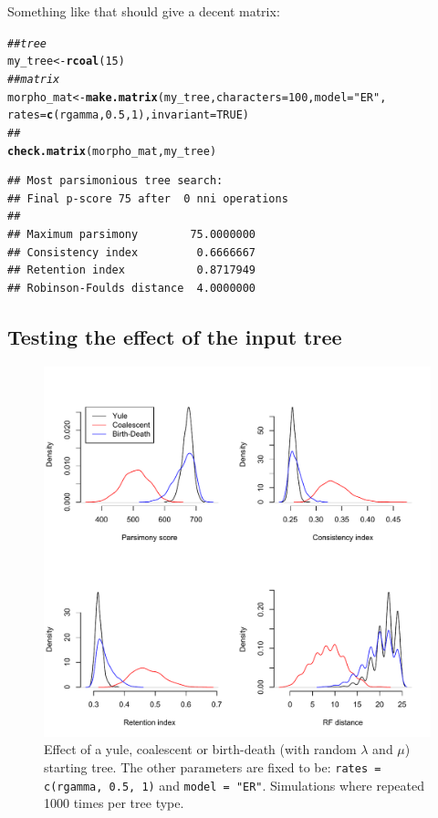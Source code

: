 \documentclass{article}\usepackage[]{graphicx}\usepackage[]{color}
\makeatletter
\newcommand{\hlnum}[1]{\textcolor[rgb]{0.686,0.059,0.569}{#1}}%
\newcommand{\hlstr}[1]{\textcolor[rgb]{0.192,0.494,0.8}{#1}}%
\newcommand{\hlcom}[1]{\textcolor[rgb]{0.678,0.584,0.686}{\textit{#1}}}%
\newcommand{\hlstd}[1]{\textcolor[rgb]{0.345,0.345,0.345}{#1}}%
\newcommand{\hlkwb}[1]{\textcolor[rgb]{0.69,0.353,0.396}{#1}}%
\newcommand{\hlkwc}[1]{\textcolor[rgb]{0.333,0.667,0.333}{#1}}%
\newcommand{\hlkwd}[1]{\textcolor[rgb]{0.737,0.353,0.396}{\textbf{#1}}}%
\newenvironment{kframe}{%
 \def\at@end@of@kframe{}%
 \ifinner\ifhmode%
  \def\at@end@of@kframe{\end{minipage}}%
  \begin{minipage}{\columnwidth}%
 \fi\fi%
 \def\FrameCommand##1{\hskip\@totalleftmargin \hskip-\fboxsep
 \colorbox{shadecolor}{##1}\hskip-\fboxsep
     \hskip-\linewidth \hskip-\@totalleftmargin \hskip\columnwidth}%
 \MakeFramed {\advance\hsize-\width
   \@totalleftmargin\z@ \linewidth\hsize
   \@setminipage}}%
 {\par\unskip\endMakeFramed%
 \at@end@of@kframe}
\newenvironment{knitrout}{}{} %
\makeatother
\begin{document}
Something like that should give a decent matrix:
\begin{knitrout}
\color{fgcolor}\begin{kframe}
\begin{alltt}
\hlcom{## tree}
\hlstd{my_tree} \hlkwb{<-} \hlkwd{rcoal}\hlstd{(}\hlnum{15}\hlstd{)}
\hlcom{## matrix}
\hlstd{morpho_mat} \hlkwb{<-} \hlkwd{make.matrix}\hlstd{(my_tree,} \hlkwc{characters} \hlstd{=} \hlnum{100}\hlstd{,} \hlkwc{model} \hlstd{=} \hlstr{"ER"}\hlstd{,}
    \hlkwc{rates} \hlstd{=} \hlkwd{c}\hlstd{(rgamma,} \hlnum{0.5}\hlstd{,} \hlnum{1}\hlstd{),} \hlkwc{invariant} \hlstd{=} \hlnum{TRUE}\hlstd{)}
\hlcom{## }
\hlkwd{check.matrix}\hlstd{(morpho_mat, my_tree)}
\end{alltt}
\begin{verbatim}
## Most parsimonious tree search:
## Final p-score 75 after  0 nni operations
##                                    
## Maximum parsimony        75.0000000
## Consistency index         0.6666667
## Retention index           0.8717949
## Robinson-Foulds distance  4.0000000
\end{verbatim}
\end{kframe}
\end{knitrout}

\subsection{Testing the effect of the input tree}

\begin{figure}[!htbp]
\centering
   \includegraphics[width=1\textwidth]{Tree_effect.pdf}
\caption{Effect of a yule, coalescent or birth-death (with random $\lambda$ and $\mu$) starting tree.
The other parameters are fixed to be: \texttt{rates = c(rgamma, 0.5, 1)} and \texttt{model = "ER"}.
Simulations where repeated 1000 times per tree type.}
\label{Tree_effect}
\end{figure}
\end{document}
